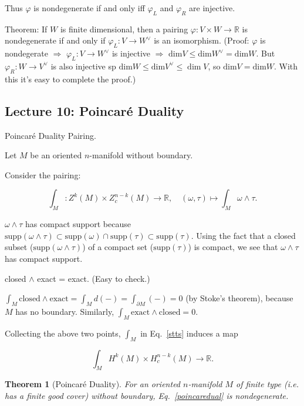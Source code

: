 \documentclass{article}
\theoremstyle{mystyle}
\newtheorem*{theorem*}{Theorem}
\theoremstyle{remark}
\numberwithin{equation}{section}
\begin{document}
Thus $\varphi$ is nondegenerate if and only iff $\varphi_L$ and $\varphi_R$ are injective. 

Theorem: If $W$ is finite dimensional, then a pairing $\varphi\colon V\times W\rightarrow \mathbb{R}$ is nondegenerate if and only if $\varphi_L\colon V\rightarrow W^\vee$ is an isomorphism. (Proof: $\varphi$ is nondegerate $\Rightarrow$ $\varphi_L\colon V\rightarrow W^\vee$ is injective $\Rightarrow$ $\mathrm{dim}V\leq \mathrm{dim} W^\vee = \mathrm{dim}W$. But $\varphi_R\colon W\rightarrow V^\vee$ is also injective sp $\mathrm{dim}W\leq \mathrm{dim}V^\vee \leq \dim V$, so $\mathrm{dim}V = \mathrm{dim}W$. With this it's easy to complete the proof.)


\subsection{Lecture 10: Poincar\'e Duality}

Poincar\'e Duality Pairing.

Let $M$ be an oriented $n$-manifold without boundary.

Consider the pairing: 

\begin{equation}\label{stts}
\int_M\colon Z^k(M)\times Z_c^{n-k}(M)\rightarrow \mathbb{R},\quad (\omega,\tau)\mapsto \int_M \omega \wedge \tau.
\end{equation}

$\omega\wedge \tau$ has compact support because $\text{supp}(\omega\wedge \tau) \subset \text{supp}(\omega)\cap \text{supp}(\tau) \subset \text{supp}(\tau)$. Using the fact that a closed subset ($\text{supp}(\omega\wedge \tau)$) of a compact set ($\text{supp}(\tau)$) is compact, we see that $\omega\wedge \tau$ has compact support.

closed $\wedge$ exact = exact. (Easy to check.)

$\int_M\text{closed}\wedge \text{exact} = \int_M d(-) = \int_{\partial M} (-) = 0$ (by Stoke's theorem), because $M$ has no boundary. Similarly, $\int_M\text{exact}\wedge \text{closed} = 0$.

Collecting the above two points,  $\int_M$ in Eq.~\eqref{stts} induces a map

\begin{equation}\label{poincaredual}
\int_M H^k(M)\times H^{n-k}_c(M)\rightarrow \mathbb{R}.
\end{equation}

\begin{theorem*}[Poincar\'e Duality]
For an oriented $n$-manifold $M$ of finite type (i.e. has a finite good cover) without boundary, Eq.~\eqref{poincaredual} is nondegenerate.
\end{theorem*}
\end{document}

